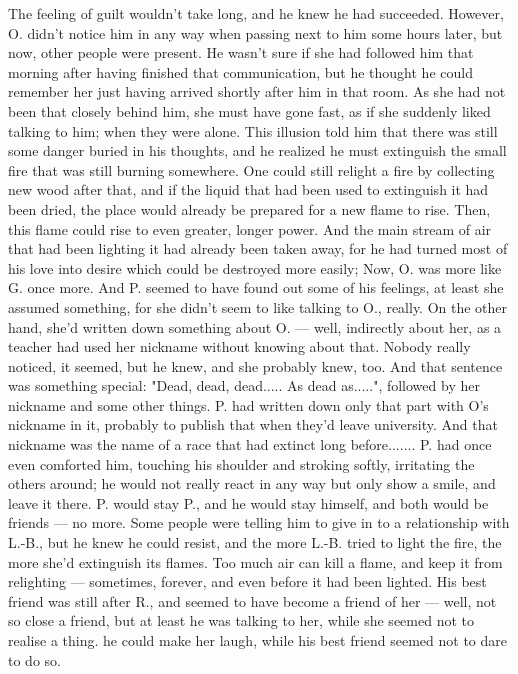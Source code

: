 The feeling of guilt wouldn't take long, and he knew he had succeeded. However, O. didn't notice him in any way when passing next to him some hours later, but now, other people were present. He wasn't sure if she had followed him that morning after having finished that communication, but he thought he could remember her just having arrived shortly after him in that room. As she had not been that closely behind him, she must have gone fast, as if she suddenly liked talking to him; when they were alone. 
This illusion told him that there was still some danger buried in his thoughts, and he realized he must extinguish the small fire that was still burning somewhere. 
One could still relight a fire by collecting new wood after that, and if the liquid that had been used to extinguish it had been dried, the place would already be prepared for a new flame to rise. Then, this flame could rise to even greater, longer power. 
And the main stream of air that had been lighting it had already been taken away, for he had turned most of his love into desire which could be destroyed more easily; Now, O. was more like G. once more. 
And P. seemed to have found out some of his feelings, at least she assumed something, for she didn't seem to like talking to O., really. On the other hand, she'd written down something about O. --- well, indirectly about her, as a teacher had used her nickname without knowing about that. Nobody really noticed, it seemed, but he knew, and she probably knew, too. And that sentence was something special: "Dead, dead, dead..... As dead as.....", followed by her nickname and some other things. P. had written down only that part with O's nickname in it, probably to publish that when they'd leave university. And that nickname was the name of a race that had extinct long before.......
P. had once even comforted him, touching his shoulder and stroking softly, irritating the others around; he would not really react in any way but only show a smile, and leave it there. P. would stay P., and he would stay himself, and both would be friends --- no more. 
Some people were telling him to give in to a relationship with L.-B., but he knew he could resist, and the more L.-B. tried to light the fire, the more she'd extinguish its flames. Too much air can kill a flame, and keep it from relighting --- sometimes, forever, and even before it had been lighted. 
His best friend was still after R., and seemed to have become a friend of her --- well, not so close a friend, but at least he was talking to her, while she seemed not to realise a thing. he could make her laugh, while his best friend seemed not to dare to do so. 
